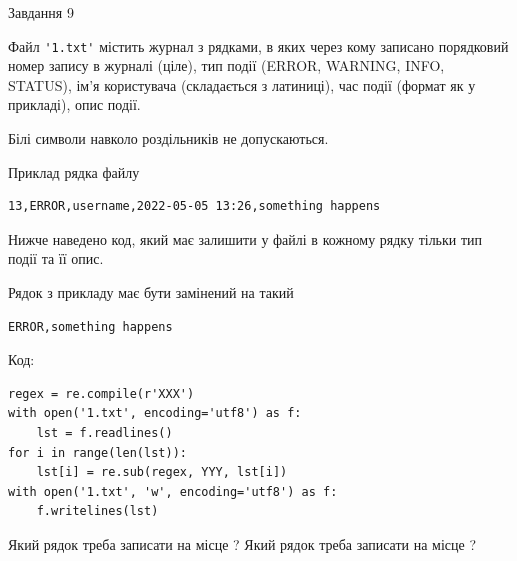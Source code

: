 \documentclass[12pt, ukrainian]{article}
\def\code#1{\Verb!#1!}
\begin{document}
{\begin{minipage}[t]{8.0cm}
\end{minipage}

               
{\begin{center}Завдання {9}\end{center}}
\vspace{-4mm}
Файл \code{'1.txt'} містить журнал з рядками, в яких через кому записано поряд\-ко\-вий номер запису в журналі (ціле), тип події (ERROR, WARNING, INFO, STATUS), ім'я користувача (складається з латиниці), час події (фор\-мат як у прикладі), опис події.

Білі символи навколо роздільників не допускаються.

Приклад рядка файлу



\begin{verbatim}
13,ERROR,username,2022-05-05 13:26,something happens
\end{verbatim}


Нижче наведено код, який має залишити у файлі в кожному рядку тільки тип події та її опис.

Рядок з прикладу має бути замінений на такий



\begin{verbatim}
ERROR,something happens
\end{verbatim}




Код:



\begin{verbatim}
regex = re.compile(r'XXX')
with open('1.txt', encoding='utf8') as f:
    lst = f.readlines()
for i in range(len(lst)):
    lst[i] = re.sub(regex, YYY, lst[i])
with open('1.txt', 'w', encoding='utf8') as f:
    f.writelines(lst)
\end{verbatim}







Який рядок треба записати на місце  ?
Який рядок треба записати на місце  ?\par

}
\end{document}
